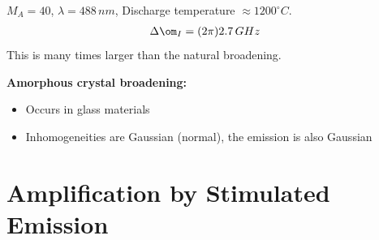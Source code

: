 \documentclass[a4paper, 11pt, normalem]{report}
\begin{document}
\begin{example}
$M_A = 40$, $\lambda=488\,nm$, Discharge temperature $\approx 1200^\circ C$.
\begin{align}
    \Delta\om_I &= (2\pi) 2.7\,GHz
\end{align}
This is many times larger than the natural broadening. 
\end{example}
\textbf{Amorphous crystal broadening:}
\begin{itemize}
    \item Occurs in glass materials
    \item Inhomogeneities are Gaussian (normal), the emission is also Gaussian
\end{itemize}

\chapter{Amplification by Stimulated Emission}
\end{document}
